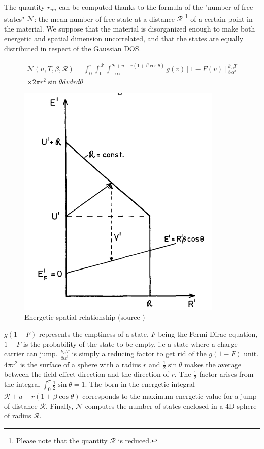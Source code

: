 The quantity $r_{nn}$ can be computed thanks to the formula of the "number of free states" $\mathscr{N}$: the mean number of free state at a distance $\mathscr{R}$ \footnote{Please note that the quantity $\mathscr{R}$ is reduced.} of a certain point in the material. We suppose that the material is disorganized enough to make both energetic and spatial dimension uncorrelated, and that the states are equally distributed in respect of the Gaussian DOS.

\begin{equation}
    \begin{aligned}
    \mathcal{N}\left(u, T, \beta, \mathscr{R}\right)=\int_{0}^{\pi} \int_{0}^{\mathscr{R}} \int_{-\infty}^{\mathscr{R}+u-r(1+\beta \cos \theta)} g\left(v\right)\left[1-F\left(v\right)\right] \frac{k_B T}{8 \alpha^{3}} \\
    \times 2 \pi r^2 \sin \theta d v d r d \theta
    \end{aligned}
    \label{eq:3_3}
\end{equation}

\begin{figure}[!h]
    \centering
    \includegraphics[width=.4\paperwidth]{figures/3_elec/R_max.png}
    \caption{Energetic-spatial relationship \label{fig:R_max} (source \cite{hopping_theory_1})}
\end{figure}

$g(1 - F)$ represents the emptiness of a state, $F$ being the Fermi-Dirac equation, $1 - F$ is the probability of the state to be empty, i.e a state where a charge carrier can jump. $\frac{k_B T}{8 \alpha^{3}}$ is simply a reducing factor to get rid of the $g(1-F)$ unit. $4\pi r^2$ is the surface of a sphere with a radius $r$ and $\frac{1}{2}\sin \theta$ makes the average between the field effect direction and the direction of $r$. The $\frac{1}{2}$ factor arises from the integral $\int_0^\pi \frac{1}{2}\sin \theta = 1$. The born in the energetic integral $\mathscr{R}+u-r(1+\beta \cos \theta)$ corresponds to the maximum energetic value for a jump of distance $\mathscr{R}$. Finally, $\mathcal{N}$ computes the number of states enclosed in a 4D sphere of radius $\mathscr{R}$.

